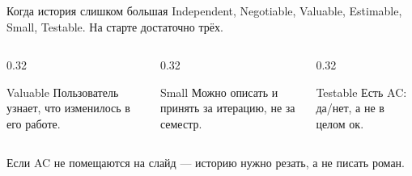 \begin{frame}{Когда история слишком большая}
  \sloppy
   Independent, Negotiable, Valuable, Estimable, Small, Testable.
  На старте достаточно трёх.

  \medskip
  \begin{columns}[T]
    \begin{column}{0.32\textwidth}
      \begin{block}{Valuable}
        Пользователь узнает, что изменилось в его работе.
      \end{block}
    \end{column}
    \begin{column}{0.32\textwidth}
      \begin{block}{Small}
        Можно описать и принять за итерацию, не за семестр.
      \end{block}
    \end{column}
    \begin{column}{0.32\textwidth}
      \begin{block}{Testable}
        Есть AC: да/нет, а не \flqq в целом ок\frqq.
      \end{block}
    \end{column}
  \end{columns}

  \vspace{0.45em}
  {\small\color{acGray}
  Если AC не помещаются на слайд --- историю нужно резать, а не писать роман.}
\end{frame}
